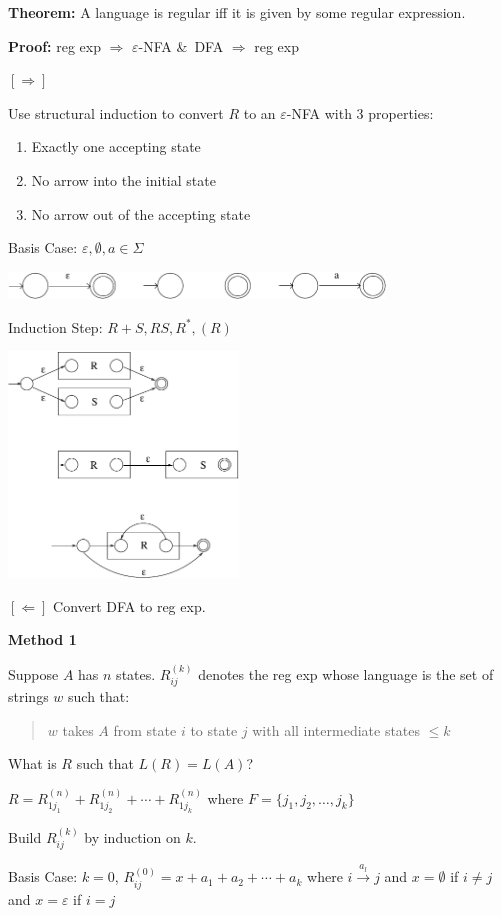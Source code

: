 \begin{frame}

{\bf Theorem:}  A language is regular iff it is given by some regular
expression.

{\bf Proof:}  reg exp $\Longrightarrow$ $\varepsilon$-NFA \&\
DFA $\Longrightarrow$ reg exp

$[\Longrightarrow]$

Use structural induction to convert $R$ to an $\varepsilon$-NFA with
3 properties:
\begin{enumerate}
\item  Exactly one accepting state
\item  No arrow into the initial state
\item  No arrow out of the accepting state
\end{enumerate}

Basis Case: $\varepsilon,\emptyset,a\in\Sigma$

\begin{center}
\includegraphics[width=10cm]{figures/4.pdf}
\end{center}
\end{frame}

\begin{frame}
Induction Step: $R+S,RS,R^*,(R)$

\includegraphics[height=6cm]{figures/5.pdf}
\end{frame}

\begin{frame}
$[\Longleftarrow]$ Convert DFA to reg exp.

{\bf Method 1}

Suppose $A$ has $n$ states.  $R^{(k)}_{ij}$ denotes the reg exp whose
language is the set of strings $w$ such that:
\begin{quote}
$w$ takes $A$ from state $i$ to state $j$ with all intermediate states
$\le k$
\end{quote}
What is $R$ such that $L(R)=L(A)$?

$R=R_{1j_1}^{(n)}+R_{1j_2}^{(n)}+\cdots+R_{1j_k}^{(n)}$
where $F=\{j_1,j_2,\ldots,j_k\}$

Build $R_{ij}^{(k)}$ by induction on $k$.

Basis Case: $k=0$, $R_{ij}^{(0)}=x+a_1+a_2+\cdots+a_k$ where
$i\stackrel{a_l}{\longrightarrow}j$ and $x=\emptyset$ if $i\neq j$ and
$x=\varepsilon$ if $i=j$
\end{frame}

